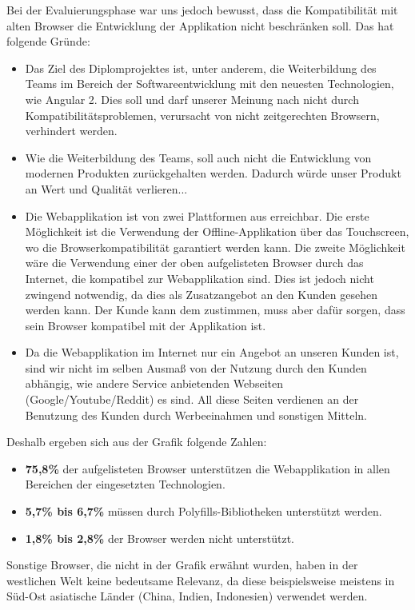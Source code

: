 \clearpage
Bei der Evaluierungsphase war uns jedoch bewusst, dass die Kompatibilität mit alten Browser die Entwicklung der Applikation nicht beschränken soll. Das hat folgende Gründe:
\begin{itemize}
    \item Das Ziel des Diplomprojektes ist, unter anderem, die Weiterbildung des Teams im Bereich der Softwareentwicklung mit den neuesten Technologien, wie Angular 2. Dies soll und darf unserer Meinung nach nicht durch Kompatibilitätsproblemen, verursacht von nicht zeitgerechten Browsern, verhindert werden.
    \item Wie die Weiterbildung des Teams, soll auch nicht die Entwicklung von modernen Produkten zurückgehalten werden. Dadurch würde unser Produkt an Wert und Qualität verlieren...
    \item Die Webapplikation ist von zwei Plattformen aus erreichbar. Die erste Möglichkeit ist die Verwendung der Offline-Applikation über das Touchscreen, wo die Browserkompatibilität garantiert werden kann.
    Die zweite Möglichkeit wäre die Verwendung einer der oben aufgelisteten Browser durch das Internet, die kompatibel zur Webapplikation sind. Dies ist jedoch nicht zwingend notwendig, da dies als Zusatzangebot an den Kunden gesehen werden kann. Der Kunde kann dem zustimmen, muss aber dafür sorgen, dass sein Browser kompatibel mit der Applikation ist.
    \item Da die Webapplikation im Internet nur ein Angebot an unseren Kunden ist, sind wir nicht im selben Ausmaß von der Nutzung durch den Kunden abhängig, wie andere Service anbietenden Webseiten (Google/Youtube/Reddit) es sind. All diese Seiten verdienen an der Benutzung des Kunden durch Werbeeinahmen und sonstigen Mitteln.
\end{itemize}

Deshalb ergeben sich aus der Grafik folgende Zahlen:

\begin{itemize}
    \item \textbf{75,8\%} der aufgelisteten Browser unterstützen die Webapplikation in allen Bereichen der eingesetzten Technologien.
    \item \textbf{5,7\% bis 6,7\%} müssen durch Polyfills-Bibliotheken unterstützt werden.
    \item \textbf{1,8\% bis 2,8\%} der Browser werden nicht unterstützt.
\end{itemize}

Sonstige Browser, die nicht in der Grafik erwähnt wurden, haben in der westlichen Welt keine bedeutsame Relevanz, da diese beispielsweise meistens in Süd-Ost asiatische Länder (China, Indien, Indonesien) verwendet werden.

